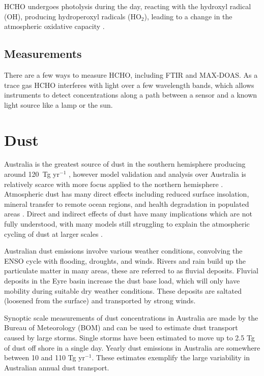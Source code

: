     HCHO undergoes photolysis during the day, reacting with the hydroxyl radical (OH), producing hydroperoxyl radicals (HO$_2$), leading to a change in the atmospheric oxidative capacity \citep{Crutzen1999, Wagner2002}.
    
    
  \subsection{Measurements}
    There are a few ways to measure HCHO, including FTIR and MAX-DOAS. As a trace gas HCHO interferes with light over a few wavelength bands, which allows instruments to detect concentrations along a path between a sensor and a known light source like a lamp or the sun.
  
\section{Dust}
\label{ch1:sec:dust}

  Australia is the greatest source of dust in the southern hemisphere producing around 120~Tg yr$^{-1}$ \citep{Li_2008}, however model validation and analysis over Australia is relatively scarce with more focus applied to the northern hemisphere \citep{Duncan_Fairlie_2007,Ridley_2013}.
  Atmospheric dust has many direct effects including reduced surface insolation, mineral transfer to remote ocean regions, and health degradation in populated areas \citep{Shao_2007}.
  Direct and indirect effects of dust have many implications which are not fully understood, with many models still struggling to explain the atmospheric cycling of dust at larger scales \citep{Rotstayn_2011}.

  Australian dust emissions involve various weather conditions, convolving the ENSO cycle with flooding, droughts, and winds.
  Rivers and rain build up the particulate matter in many areas, these are referred to as fluvial deposits.
  Fluvial deposits in the Eyre basin increase the dust base load, which will only have mobility during suitable dry weather conditions.
  These deposits are saltated (loosened from the surface) and transported by strong winds\citep{Zender2003}.

  Synoptic scale measurements of dust concentrations in Australia are made by the Bureau of Meteorology (BOM) and can be used to estimate dust transport caused by large storms. 
  Single storms have been estimated to move up to 2.5 Tg of dust off shore in a single day.
  Yearly dust emissions in Australia are somewhere between 10 and 110 Tg yr$^{-1}$.
  These estimates exemplify the large variability in Australian annual dust transport.

